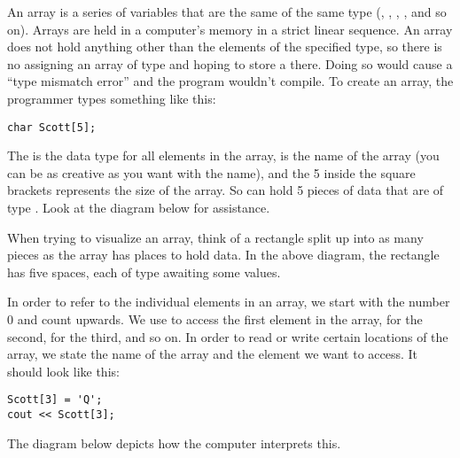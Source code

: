 
An array is a series of variables that are the same of the same type (, , , , and so on).
Arrays are held in a computer's memory in a strict linear sequence.
An array does not hold anything other than the elements of the specified type, so there is no assigning an array of type  and hoping to store a  there. 
Doing so would cause a ``type mismatch error'' and the program wouldn't compile. 
To create an array, the programmer types something like this:

\noindent\begin{minipage}{\linewidth}\begin{lstlisting}
char Scott[5];
\end{lstlisting}\end{minipage}

The  is the data type for all elements in the array,  is the name of the array (you can be as creative as you want with the name), and the 5 inside the square brackets represents the size of the array. 
So  can hold 5 pieces of data that are of type . 
Look at the diagram below for assistance.


When trying to visualize an array, think of a rectangle split up into as many pieces as the array has places to hold data.
In the above diagram, the rectangle has five spaces, each of type  awaiting some values. 

In order to refer to the individual elements in an array, we start with the number 0 and count upwards. 
We use \Code{[0]} to access the first element in the array, \Code{[1]} for the second, \Code{[2]} for the third, and so on. 
In order to read or write certain locations of the array, we state the name of the array and the element we want to access. 
It should look like this:

\noindent\begin{minipage}{\linewidth}\begin{lstlisting}
Scott[3] = 'Q';
cout << Scott[3];
\end{lstlisting}\end{minipage}

The diagram below depicts how the computer interprets this.

